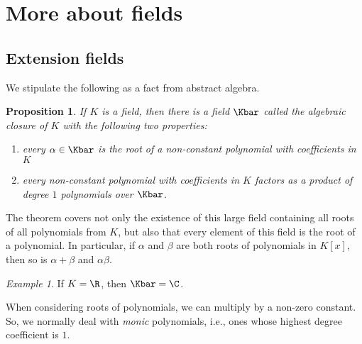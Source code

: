 \documentclass[12pt]{amsart}
\theoremstyle{plain}
\newtheorem{prop}[thm]{Proposition}
\theoremstyle{definition}
\theoremstyle{remark}
\newtheorem*{exam}{Example}
\begin{document}
\section{More about fields}
\subsection{Extension fields}

We stipulate the following as a fact from abstract algebra.
\begin{prop}
  If $K$ is a field, then there is a field $\Kbar$ called the {\em
    algebraic closure of $K$} with the following two properties:
  \begin{enumerate}
  \item every $\alpha\in \Kbar$ is the root of a non-constant polynomial with
    coefficients in $K$
  \item every non-constant polynomial with coefficients in $K$ factors
    as a product of degree $1$ polynomials over $\Kbar$.
  \end{enumerate}
\end{prop}
The theorem covers not only the existence of this large field
containing all roots of all polynomials from $K$, but also that every
element of this field is the root of a polynomial.  In particular, if
$\alpha$ and $\beta$ are both roots of polynomials in $K[x]$, then so
is $\alpha+\beta$ and $\alpha\beta$.


\begin{exam}
  If $K=\R$, then $\Kbar=\C$.
\end{exam}

When considering roots of polynomials, we can multiply by a non-zero
constant.  So, we normally deal with \emph{monic} polynomials, i.e.,
ones whose highest degree coefficient is $1$.
\end{document}
